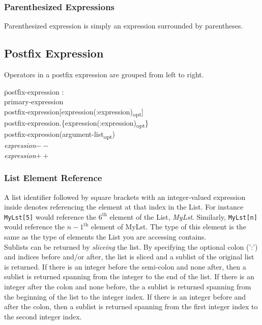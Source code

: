\documentclass{article}
\begin{document}
\subsubsection{Parenthesized Expressions}
Parenthesized expression is simply an expression surrounded by parentheses. 

\subsection{Postfix Expression}
Operators in a postfix expression are grouped from left to right.
\begin{itshape}
\begin{tabbing}
	\= post\=fix-expression : \\
		\> \> primary-expression \\
		\>\> postfix-expression[expression(:expression)\textsubscript{opt}] \\		
		\>\> postfix-expression.\{expression(:expression)\textsubscript{opt}\}\\
		\>\> postfix-expression(argument-list\textsubscript{opt}) \\ 
		\> \> \emph{expression}$--$ \\
		\> \> \emph{expression}$++$ 
\end{tabbing}
\end{itshape}

\subsubsection{List Element Reference}
A list identifier followed by square brackets with an integer-valued expression inside denotes referencing the element at that index in the List. For instance \lstinline!MyLst[5]! would reference the $6^\mathrm{th}$ element of the List, \emph{MyLst}. Similarly, \lstinline!MyLst[n]! would reference the $n-1^\mathrm{th}$ element of MyLst. The type of this element is the same as the type of elements the List you are accessing contains. \\
Sublists can be returned by \emph{sliceing} the list. By specifying the optional colon (':') and indices before and/or after, the list is sliced and a sublist of the original list is returned. If there is an integer before the semi-colon and none after, then a sublist is returned spanning from the integer to the end of the list. If there is an integer after the colon and none before, the a sublist is returned spanning from the beginning of the list to the integer index. If there is an integer before and after the colon, then a sublist is returned spanning from the first integer index to the second integer index.
\end{document}

